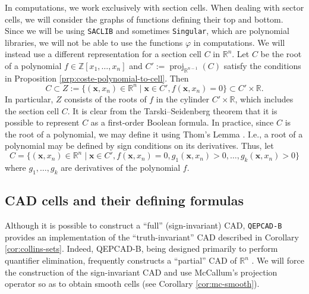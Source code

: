 \documentclass[
]{book}
\theoremstyle{definition}
\theoremstyle{definition}
\theoremstyle{definition}
\theoremstyle{definition}
\theoremstyle{remark}
\begin{document}
In computations, we work exclusively with section cells. When dealing with sector cells, we will consider the graphs of functions defining their top and bottom.
Since we will be using \texttt{SACLIB} and sometimes \texttt{Singular}, which are polynomial libraries, we will not be able to use the functions \(\varphi\) in computations. We will instead use a different representation for a section cell \(C\) in \(\mathbb{R}^n\). Let \(C\) be the root of a polynomial \(f \in \mathbb{Z}[x_1,\ldots,x_n]\) and \(C' := {\operatorname{proj}_{\mathbb{R}^{n-1}}}(C)\) satisfy the conditions in Proposition \ref{prp:coste-polynomial-to-cell}. Then
\[
C \subset Z := \{ (\mathbf{x},x_n) \in \mathbb{R}^n \mid \mathbf{x} \in C', f(\mathbf{x},x_n) = 0 \} \subset C' \times \mathbb{R}.
\]
In particular, \(Z\) consists of the roots of \(f\) in the cylinder \(C' \times \mathbb{R}\), which includes the section cell \(C\). It is
clear from the Tarski--Seidenberg theorem that it is possible to represent \(C\) as a first-order Boolean formula. In practice, since \(C\) is the root of a polynomial, we may define it using Thom's Lemma \citep{costeRoyThomLemma}. I.e., a root of a polynomial may be defined by sign conditions on its derivatives. Thus, let
\[
C = \{ (\mathbf{x},x_n) \in \mathbb{R}^n \mid \mathbf{x} \in C', f(\mathbf{x},x_n) = 0, g_1(\mathbf{x},x_n) > 0, \ldots, g_k(\mathbf{x},x_n) > 0 \}
\]
where \(g_1,\ldots,g_k\) are derivatives of the polynomial \(f\).

\hypertarget{sec:cell-formula}{%
\subsection{CAD cells and their defining formulas}\label{sec:cell-formula}}

Although it is possible to construct a ``full'' (sign-invariant) CAD, \texttt{QEPCAD-B} provides an implementation of the ``truth-invariant'' CAD described in Corollary \ref{cor:collins-sets}. Indeed, QEPCAD-B, being designed primarily to perform quantifier elimination, frequently constructs a ``partial'' CAD of \(\mathbb{R}^n\) \citep{brownQepcad}.
We will force the construction of the sign-invariant CAD and use McCallum's projection operator so as to obtain smooth
cells (see Corollary \ref{cor:mc-smooth}).
\end{document}
